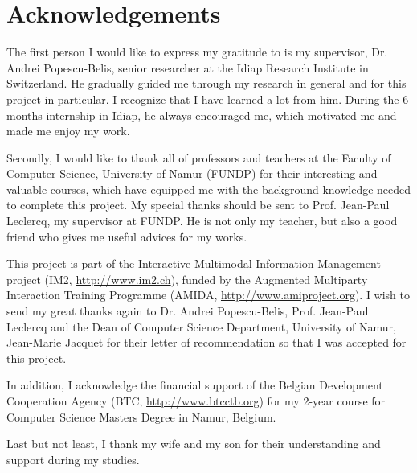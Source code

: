 


\chapter*{Acknowledgements}      %
\small

The first person I would like to express my gratitude to is my supervisor, Dr. Andrei Popescu-Belis, senior researcher at the Idiap Research Institute in Switzerland. He gradually guided me through my research in general and for this project in particular. I recognize that I have learned a lot from him. During the 6 months internship in Idiap, he always encouraged me, which motivated me and made me enjoy my work. 

Secondly, I would like to thank all of professors and teachers at the Faculty of Computer Science, University of Namur (FUNDP) for their interesting and valuable courses, which have equipped me with the background knowledge needed to complete this project. My special thanks should be sent to Prof. Jean-Paul Leclercq, my supervisor at FUNDP. He is not only my teacher, but also a good friend who gives me useful advices for my works. 

This project is part of the Interactive Multimodal Information Management project (IM2, \url{http://www.im2.ch}), funded by the Augmented Multiparty Interaction Training Programme (AMIDA, \url{http://www.amiproject.org}). I wish to send my great thanks again to Dr. Andrei Popescu-Belis, Prof. Jean-Paul Leclercq and the Dean of Computer Science Department, University of Namur, Jean-Marie Jacquet for their letter of recommendation so that I was accepted for this project.

In addition, I acknowledge the financial support of the Belgian Development Cooperation Agency (BTC, \url{http://www.btcctb.org}) for my 2-year course for Computer Science Masters Degree in Namur, Belgium.

Last but not least, I thank my wife and my son for their understanding and support during my studies. %

\normalsize



